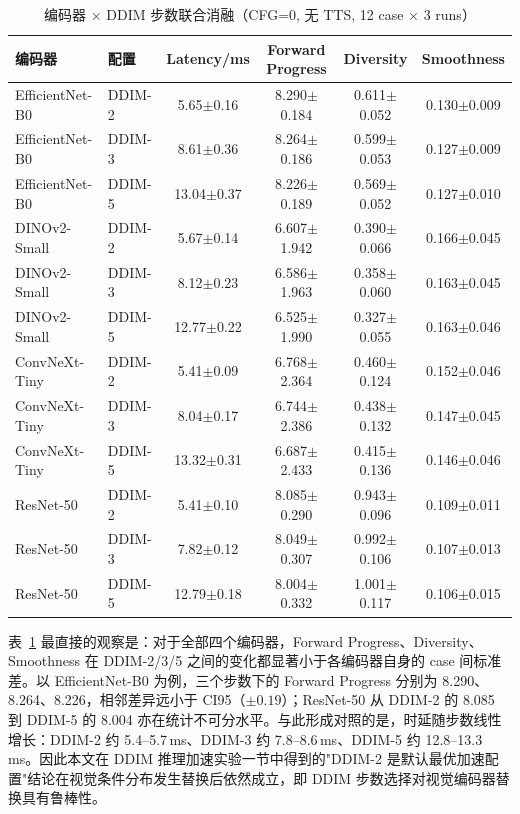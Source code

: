 \begin{table}[htbp]
    \centering
    \small
    \caption{编码器 $\times$ DDIM 步数联合消融（CFG=0, 无 TTS, 12 case $\times$ 3 runs）}
    \label{tab:encoder-ddim-joint}
    \begin{tabular}{llcccc}
        \toprule
        编码器 & 配置 & Latency/ms & Forward Progress & Diversity & Smoothness \\
        \midrule
        EfficientNet-B0 & DDIM-2 & 5.65$\pm$0.16 & 8.290$\pm$0.184 & 0.611$\pm$0.052 & 0.130$\pm$0.009 \\
        EfficientNet-B0 & DDIM-3 & 8.61$\pm$0.36 & 8.264$\pm$0.186 & 0.599$\pm$0.053 & 0.127$\pm$0.009 \\
        EfficientNet-B0 & DDIM-5 & 13.04$\pm$0.37 & 8.226$\pm$0.189 & 0.569$\pm$0.052 & 0.127$\pm$0.010 \\
        DINOv2-Small & DDIM-2 & 5.67$\pm$0.14 & 6.607$\pm$1.942 & 0.390$\pm$0.066 & 0.166$\pm$0.045 \\
        DINOv2-Small & DDIM-3 & 8.12$\pm$0.23 & 6.586$\pm$1.963 & 0.358$\pm$0.060 & 0.163$\pm$0.045 \\
        DINOv2-Small & DDIM-5 & 12.77$\pm$0.22 & 6.525$\pm$1.990 & 0.327$\pm$0.055 & 0.163$\pm$0.046 \\
        ConvNeXt-Tiny & DDIM-2 & 5.41$\pm$0.09 & 6.768$\pm$2.364 & 0.460$\pm$0.124 & 0.152$\pm$0.046 \\
        ConvNeXt-Tiny & DDIM-3 & 8.04$\pm$0.17 & 6.744$\pm$2.386 & 0.438$\pm$0.132 & 0.147$\pm$0.045 \\
        ConvNeXt-Tiny & DDIM-5 & 13.32$\pm$0.31 & 6.687$\pm$2.433 & 0.415$\pm$0.136 & 0.146$\pm$0.046 \\
        ResNet-50 & DDIM-2 & 5.41$\pm$0.10 & 8.085$\pm$0.290 & 0.943$\pm$0.096 & 0.109$\pm$0.011 \\
        ResNet-50 & DDIM-3 & 7.82$\pm$0.12 & 8.049$\pm$0.307 & 0.992$\pm$0.106 & 0.107$\pm$0.013 \\
        ResNet-50 & DDIM-5 & 12.79$\pm$0.18 & 8.004$\pm$0.332 & 1.001$\pm$0.117 & 0.106$\pm$0.015 \\
        \bottomrule
    \end{tabular}
\end{table}

表~\ref{tab:encoder-ddim-joint} 最直接的观察是：对于全部四个编码器，Forward Progress、Diversity、Smoothness 在 DDIM-2/3/5 之间的变化都显著小于各编码器自身的 case 间标准差。以 EfficientNet-B0 为例，三个步数下的 Forward Progress 分别为 8.290、8.264、8.226，相邻差异远小于 CI95（$\pm0.19$）；ResNet-50 从 DDIM-2 的 8.085 到 DDIM-5 的 8.004 亦在统计不可分水平。与此形成对照的是，时延随步数线性增长：DDIM-2 约 5.4--5.7\,ms、DDIM-3 约 7.8--8.6\,ms、DDIM-5 约 12.8--13.3\,ms。因此本文在 DDIM 推理加速实验一节中得到的"DDIM-2 是默认最优加速配置"结论在视觉条件分布发生替换后依然成立，即 DDIM 步数选择对视觉编码器替换具有鲁棒性。


